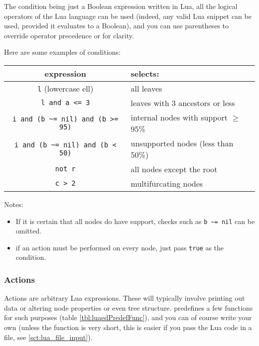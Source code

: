 The condition being just a Boolean expression written in Lua, all the logical
operators of the Lua language can be used (indeed, any valid Lua snippet can be
used, provided it evaluates to a Boolean), and you can use parentheses to
override operator precedence or for clarity.

\noindent{}Here are some examples of \luaed{} conditions:

\begin{center}
\begin{tabular}{cl}
expression & selects: \\
\hline
\texttt{l} (lowercase ell) & all leaves \\
\texttt{l and a <= 3} & leaves with 3 ancestors or less \\
\texttt{i and (b \~{ }= nil) and (b >= 95)} & internal nodes with support $\geq$ 95\% \\ 
\texttt{i and (b \~{ }= nil) and (b < 50)} & unsupported nodes (less than 50\%) \\
\texttt{not r} & all nodes except the root \\
\texttt{c > 2} & multifurcating nodes
\end{tabular}
\end{center}

Notes:
\begin{itemize}
	\item If it is certain that all nodes do have support, checks such as \verb+b ~= nil+ can be omitted. 
	\item if an action must be performed on every node, just pass \texttt{true} as
	the condition.
\end{itemize}

\subsubsection{Actions}

Actions are arbitrary Lua expressions. These will typically involve printing out
data or altering node properties or even tree structure. \luaed{} predefines a
few functions for such purposes (table \ref{tbl:luaedPredefFunc}), and you can
of course write your own (unless the function is very short, this is easier if
you pass the Lua code in a file, see \ref{sct:lua_file_input}).

